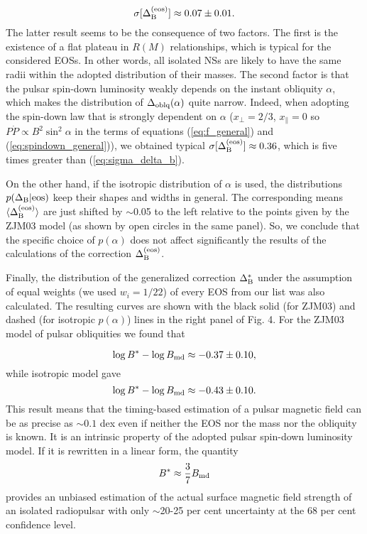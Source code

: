 \documentclass[fleqn,usenatbib]{mnras}
\begin{document}
\begin{equation}
    \sigma[\Delta^{\rm (eos)}_{\rm B}] \approx 0.07\pm 0.01 .
    \label{eq:sigma_delta_b}
\end{equation}
The latter result seems to be the consequence of two factors. The
first is the existence of a flat plateau in $R(M)$ relationships, which
is typical for the considered EOSs. In other words, all isolated NSs
are likely to have the same radii within the adopted distribution
of their masses. The second factor is that the pulsar spin-down
luminosity weakly depends on the instant obliquity $\alpha$, which makes
the distribution of $\Delta_{\rm oblq}(\alpha)$  quite narrow. Indeed, when adopting the
spin-down law that is strongly dependent on $\alpha$ ($x_{\perp} = 2/3$, $x_{\parallel} = 0$ so $P\dot P \propto B^2 \sin^2\alpha$ in the terms of equations (\ref{eq:f_general}) and (\ref{eq:spindown_general})), we obtained
typical $\sigma[\Delta^{\rm(eos)}_{\rm B}] \approx 0.36$, which is five times greater than (\ref{eq:sigma_delta_b}).

On the other hand, if the isotropic distribution of $\alpha$ is used, the
distributions $p(\Delta_{\rm B}\vert{\rm eos})$ keep their shapes and widths in general. The
corresponding means $\langle \Delta^{\rm(eos)}_{\rm B } \rangle$ are just shifted by $\sim$0.05 to the left
relative to the points given by the ZJM03 model (as shown by open
circles in the same panel). So, we conclude that the specific choice
of $p(\alpha)$ does not affect significantly the results of the calculations
of the correction $\Delta_{\rm B}^{\rm (eos)}$.

Finally, the distribution of the generalized correction $\Delta^*_{\rm B}$ under
the assumption of equal weights (we used $w_i = 1/22$) of every EOS
from our list was also calculated. The resulting curves are shown
with the black solid (for ZJM03) and dashed (for isotropic $p(\alpha)$)
lines in the right panel of Fig. 4. For the ZJM03 model of pulsar
obliquities we found that

\begin{equation}
    \log B^{\rm *} - \log B_{\rm md} \approx -0.37 \pm 0.10 ,
\end{equation}
while isotropic model gave
\begin{equation}
    \log B^{\rm *} - \log B_{\rm md} \approx -0.43 \pm 0.10 .
\end{equation}
This result means that the timing-based estimation of a pulsar magnetic field can be as precise as  $\sim 0.1$ dex even if neither the EOS
nor the mass nor the obliquity is known. It is an intrinsic property
of the adopted pulsar spin-down luminosity model. If it is rewritten
in a linear form, the quantity
\begin{equation}
    B^* \approx \frac37 B_{\rm md}
\end{equation}
provides an unbiased estimation of the actual surface magnetic
field strength of an isolated radiopulsar with only $\sim$20-25 per cent
uncertainty at the 68 per cent confidence level.
\end{document}
